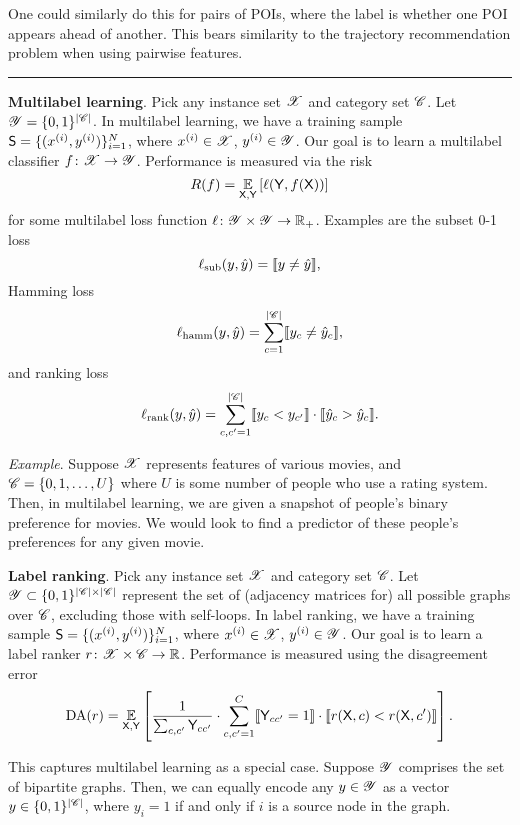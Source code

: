 One could similarly do this for pairs of POIs, where the label is whether one POI appears ahead of another.
This bears similarity to the trajectory recommendation problem when using pairwise features.


\vspace{12pt}
\hrule
\vspace{12pt}

%
\textbf{Multilabel learning}.
Pick any instance set $\mathscr{X}$
and category set $\mathscr{C}$.
Let $\mathscr{Y} = \{ 0, 1 \}^{|\mathscr{C}|}$.
In multilabel learning,
we have a training sample $\mathsf{S} = \{ ( x^{(i)}, y^{(i)} ) \}_{i = 1}^N$,
where
$x^{(i)} \in \mathscr{X}$,
$y^{(i)} \in \mathscr{Y}$.
Our goal is to learn a multilabel classifier $f \colon \mathscr{X} \to \mathscr{Y}$.
Performance is measured via the risk
$$ R( f ) = \underset{\mathsf{X}, \mathsf{Y}}{\mathbb{E}}\left[  \ell( \mathsf{Y}, f( \mathsf{X} ) )  \right] $$
for some multilabel loss function $\ell \colon \mathscr{Y} \times \mathscr{Y} \to \mathbb{R}_+$.
Examples are the subset 0-1 loss
$$ \ell_{\mathrm{sub}}( y, \hat{y} ) = \llbracket  y \neq \hat{y}  \rrbracket, $$
Hamming loss
$$ \ell_{\mathrm{hamm}}( y, \hat{y} ) = \sum_{c = 1}^{|\mathscr{C}|} \llbracket  y_c \neq \hat{y}_c  \rrbracket, $$
and ranking loss
$$ \ell_{\mathrm{rank}}( y, \hat{y} ) = \sum_{c, c' = 1}^{|\mathscr{C}|} \llbracket  y_c < y_{c'}  \rrbracket \cdot \llbracket  \hat{y}_c > \hat{y}_c  \rrbracket. $$

\emph{Example}.
Suppose $\mathscr{X}$ represents features of various movies, and
$\mathscr{C} = \{ 0, 1, \ldots, U \}$ where $U$ is some number of people who use a rating system.
Then, in multilabel learning, we are given a snapshot of people's binary preference for movies.
We would look to find a predictor of these people's preferences for any given movie.


%
\textbf{Label ranking}.
Pick any instance set $\mathscr{X}$
and category set $\mathscr{C}$.
Let $\mathscr{Y} \subset \{ 0, 1 \}^{|\mathscr{C}| \times |\mathscr{C}|}$ represent the set of (adjacency matrices for) all possible graphs over $\mathscr{C}$, excluding those with self-loops.
In label ranking,
we have a training sample $\mathsf{S} = \{ ( x^{(i)}, y^{(i)} ) \}_{i = 1}^N$,
where
$x^{(i)} \in \mathscr{X}$,
$y^{(i)} \in \mathscr{Y}$.
Our goal is to learn a label ranker $r \colon \mathscr{X} \times \mathscr{C} \to \mathbb{R}$.
Performance is measured using the disagreement error
$$ \mathrm{DA}( r ) = \underset{\mathsf{X}, \mathsf{Y}}{\mathbb{E}}\left[  \frac{1}{\sum_{c, c'} \mathsf{Y}_{c c'}} \cdot \sum_{c, c' = 1}^{C} \llbracket \mathsf{Y}_{c c'} = 1 \rrbracket \cdot \llbracket  r( \mathsf{X}, c ) < r( \mathsf{X}, c' )  \rrbracket  \right]. $$

This captures multilabel learning as a special case.
Suppose $\mathscr{Y}$ comprises the set of bipartite graphs.
Then, we can equally encode any $y \in \mathscr{Y}$
as a vector $y \in \{ 0, 1 \}^{|\mathscr{C}|}$,
where $y_i = 1$ if and only if $i$ is a source node in the graph.

